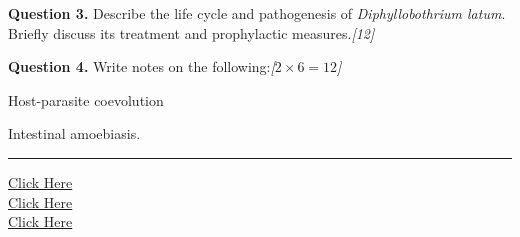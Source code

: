 \documentclass[11pt,a4paper]{article}
\newcommand{\pts}[1]{\hfill   \textit{[#1]}}
\begin{document}
\medskip


\noindent   \textbf{Question 3.} Describe the life cycle and pathogenesis of   \textit{Diphyllobothrium latum}. Briefly discuss its treatment and prophylactic measures.\pts{12}

\medskip


\noindent   \textbf{Question 4.} Write notes on the following:\pts{$2  \times 6 = 12$}

\begin{parts}
  \item Host-parasite coevolution
  \item Intestinal amoebiasis.
\end{parts}

\vfill
\rule{\linewidth}{0.4pt}

\begin{center}\small
\href{https://bhu-exam.vercel.app/}{Click Here}\\[4pt]\href{https://me-aryan.vercel.app/}{Click Here}\\[4pt]\href{https://quashan-me.vercel.app/}{Click Here}
\end{center}
\end{document}
